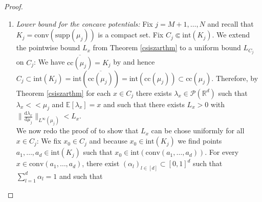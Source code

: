 \documentclass[10pt,a4paper]{amsart}
\newcommand{\RR}{\mathbb{R}}
\newcommand{\EE}{\mathbb{E}}
\newcommand{\dd}{\mathrm{d}}
\begin{document}
\begin{proof}
\begin{enumerate}
\begin{gather*}
	\end{gather*}
	and integrating with respect to the product measure
	\begin{gather*}
		\gamma_{-j}\coloneqq\mu_1\otimes\dots\mu_{j-1}\otimes\mu_{j+1}\otimes\dots\otimes\mu_N
	\end{gather*} we get a uniform upper bound for $\varphi_j^n$ through
	\begin{align*}
		\varphi_j^n(x_j)&\leq\int_{\Omega^{d-1}}\bar c(x_1,\dots,x_N)\ \dd\gamma_{-j}-\sum_{i\neq j}\int_{\Omega}\varphi_i^n(x_i)\ \dd\mu_i(x_i)\\
		&\leq\int_{\Omega^{d-1}}\bar c(x_1,\dots,x_N)\ \dd\gamma_{-j}-\sum_{i=1}^N\int_{\Omega}\varphi_i^n(x_i)\ \dd\mu_i(x_i)\\
		&\leq C
	\end{align*}
	where in the second line we have used \eqref{integralbound} and in the third line we have used the boundedness of $\bar c$ over $\Omega$ and \eqref{lowerboundmaximization}.\\
	For $j=N$ (the unnormalized concave $\varphi_N^n$) we get the upper bound
	\begin{gather*}
		\varphi_N^n(x_N)\leq\bar c(\EE[\mu_1],\dots,\EE[\mu_{N-1}],x_N)\leq C
	\end{gather*}
	using again the boundedness of $\bar c$ over $\Omega$.
	\item \textit{Lower bound for the concave potentials:}
	Fix $j=M+1,\dots,N$ and recall that $K_j=\text{conv}(\text{supp}(\mu_j))$ is a compact set. Fix $C_j\Subset \text{int}(K_j)$. We extend the pointwise bound $L_x$ from Theorem \ref{csiszarthm} to a uniform bound $L_{C_j}$ on $C_j$: We have $\overline{\text{cc}(\mu_j)}=K_j$ by \cite[Lma 1]{csiszar2001} and hence $C_j\subset\text{int}(K_j)=\text{int}(\overline{\text{cc}(\mu_j)})=\text{int}(\text{cc}(\mu_j))\subset\text{cc}(\mu_j)$. Therefore, by Theorem \ref{csiszarthm} for each $x\in C_j$ there exists $\lambda_x\in\mathcal P(\RR^d)$ such that $\lambda_x<<\mu_j$ and $\EE[\lambda_x]=x$ and such that there exists $L_x>0$ with $\|\frac{\dd\lambda_x}{\dd\mu_j}\|_{L^\infty(\mu_j)}<L_x$.\\ We now redo the proof of \cite[Thm 3]{csiszar2001} to show that $L_x$ can be chose uniformly for all $x\in C_j$:
	We fix $x_0\in C_j$ and because $x_0\in\text{int}(K_j)$ we find points $a_1,\dots,a_d\in\text{int}(K_j)$ such that $x_0\in\text{int}(\text{conv}(a_1,\dots,a_d))$. For every $x\in\text{conv}(a_1,\dots,a_d)$, there exist $(\alpha_l)_{l\in[d]}\subset[0,1]^d$ such that $\sum_{l=1}^d\alpha_l=1$ and such that

\end{enumerate}
\end{proof}
\end{document}
